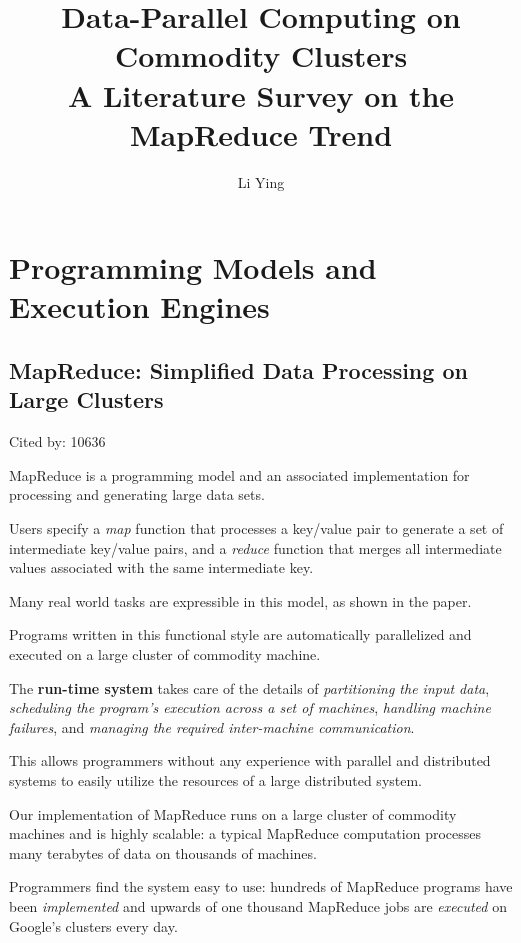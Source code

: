 \documentclass[a4paper,11pt]{article}
\author{Li Ying}
\title{Data-Parallel Computing on Commodity Clusters \\ \large{A Literature Survey on the MapReduce Trend} }
\begin{document}
\maketitle
\tableofcontents

\section{Programming Models and Execution Engines}

\subsection*{MapReduce: Simplified Data Processing on Large Clusters}
{\color{cyan} {\color{magenta} Cited by: 10636}

{\color{black} MapReduce\cite{mapred}} is a 
programming model and an 
associated implementation 
for processing and generating large data sets. 

Users specify a 
{\color{red} \em map} function that 
processes a key/value pair to generate a set of intermediate key/value pairs, and a 
{\color{red} \em reduce} function that 
merges all intermediate values associated with the same intermediate key. 

Many real world tasks are expressible in this model, as shown in the paper.

Programs written in this functional style are 
automatically parallelized and executed 
on a large cluster of commodity machine.

The {\color{red} \bf run-time system} 
takes care of the details of 
{\color{red} \em partitioning the input data}, 
{\color{red} \em scheduling the program's execution across a set of machines}, 
{\color{red} \em handling machine failures}, and 
{\color{red} \em managing the required inter-machine communication}. 

This allows programmers without any experience with parallel and distributed systems to 
easily utilize the resources of a large distributed system.

Our implementation of MapReduce runs on a large cluster of commodity machines and is highly scalable: 
a typical MapReduce computation processes many terabytes of data on thousands of machines. 

Programmers find the system easy to use: 
hundreds of MapReduce programs have been {\color{red} \em implemented} and 
upwards of one thousand MapReduce jobs are {\color{red} \em executed} on Google's clusters every day.

}
\end{document}
